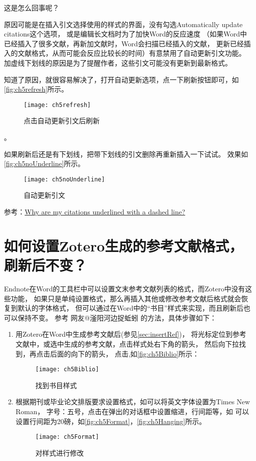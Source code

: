 \documentclass[theorem=false,mathfont=none,openany,sub3section]{easybook}
\begin{document}
{这是怎么回事呢？

原因可能是在插入引文选择使用的样式的界面，没有勾选Automatically update citations这个选项，
或是编辑长文档时为了加快Word的反应速度
（如果Word中已经插入了很多文献，再新加文献时，Word会扫描已经插入的文献，
更新已经插入的文献格式，从而可能会反应比较长的时间）有意禁用了自动更新引文功能。
加虚线下划线的原因是为了提醒作者，这些引文可能没有更新到最新格式。

知道了原因，就很容易解决了，打开自动更新选项，点一下刷新按钮即可，如\autoref{fig:ch5refresh}所示。
\begin{figure}[htbp]
	\centering
	\texttt{[image: ch5refresh]}
	\caption{点击自动更新引文后刷新}
	\label{fig:ch5refresh}
\end{figure}。


如果刷新后还是有下划线，把带下划线的引文删除再重新插入一下试试。		
效果如\autoref{fig:ch5noUnderline}所示。
\begin{figure}[htbp]
	\centering
	\texttt{[image: ch5noUnderline]}
	\caption{自动更新引文}
	\label{fig:ch5noUnderline}
\end{figure}


参考：\href{https://www.zotero.org/support/kb/citations_underlined}{Why are my citations underlined with a dashed line?}

\section{如何设置Zotero生成的参考文献格式，刷新后不变？}\label{sec:refresh}
Endnote在Word的工具栏中可以设置文末参考文献列表的格式，而Zotero中没有这些功能，
如果只是单纯设置格式，那么再插入其他或修改参考文献后格式就会恢复到默认的字体格式，
但可以通过在Word中的“书目”样式来实现，而且刷新后也可以保持不变。
参考 网友@滏阳河边捉蚯蚓 的方法，具体步骤如下：
\begin{enumerate}
	\item
	用Zotero在Word中生成参考文献后(参见\cref{sec:insertRef})，
	将光标定位到参考文献中，或选中生成的参考文献，点击样式处右下角的箭头，
	然后向下拉找到，再点击后面的向下的箭头，
	点击,如\autoref{fig:ch5Biblio}所示：
	\begin{figure}[htbp]
		\centering
		\texttt{[image: ch5Biblio]}
		\caption{找到书目样式}
		\label{fig:ch5Biblio}
	\end{figure}
	\item
	根据期刊或毕业论文排版要求设置格式，如可以将英文字体设置为Times New Roman，
	字号：五号，点击在弹出的对话框中设置缩进，行间距等，如
	可以设置行间距为20磅，如\autoref{fig:ch5Format}，\autoref{fig:ch5Hanging}所示。
	\begin{figure}[t]
		\centering
		\texttt{[image: ch5Format]}
		\caption{对样式进行修改}
		\label{fig:ch5Format}
	\end{figure}
	

\end{enumerate}}
\end{document}
